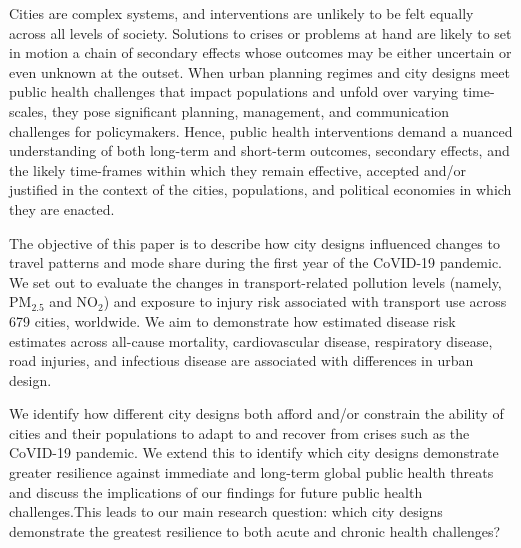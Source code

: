 \documentclass[preprint,12pt]{elsarticle}
\begin{document}
Cities are complex systems\cite{DiezRoux2015}, and interventions are unlikely to be felt equally across all levels of society. Solutions to crises or problems at hand are likely to set in motion a chain of secondary effects whose outcomes may be either uncertain or even unknown at the outset\cite{Sterman2006}. When urban planning regimes and city designs meet public health challenges that impact populations and unfold over varying time-scales\cite{casti2012x}, they pose significant planning, management, and communication challenges for policymakers\cite{thompson2022modelling,thompson2022framework}. Hence, public health interventions demand a nuanced understanding of both long-term and short-term  outcomes, secondary effects, and the likely time-frames within which they remain effective, accepted and/or justified in the context of the cities, populations, and political economies in which they are enacted\cite{dawson2016snakes, oliu2021sars}.


The objective of this paper is to describe how city designs influenced changes to travel patterns and mode share during the first year of the CoVID-19 pandemic. We set out to evaluate the changes in transport-related pollution levels (namely, PM$_{2.5}$ and NO$_{2}$) and exposure to injury risk associated with transport use across 679 cities, worldwide. We aim to demonstrate how estimated disease risk estimates across all-cause mortality, cardiovascular disease, respiratory disease, road injuries, and infectious disease are associated with differences in urban design. 

We identify how different city designs both afford and/or constrain the ability of cities and their populations to adapt to and recover from crises such as the CoVID-19 pandemic. We extend this to identify which city designs demonstrate greater resilience against immediate and long-term global public health threats and discuss the implications of our findings for future public health challenges.This leads to our main research question: which city designs demonstrate the greatest resilience to both acute and chronic health challenges?





\end{document}
